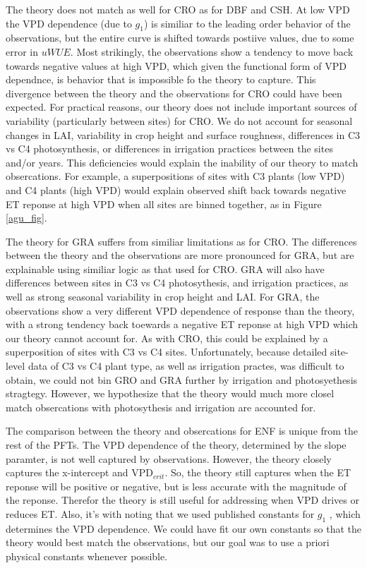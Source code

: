 \documentclass[draft,linenumbers]{agujournal}
\begin{document}
The theory does not match as well for CRO as for DBF and CSH. At low VPD the VPD dependence (due to $g_1$) is similiar to the leading order behavior of the observations, but the entire curve is shifted towards postiive values, due to some error in $uWUE$. Most strikingly, the observations show a tendency to move back towards negative values at high VPD, which given the functional form of VPD dependnce, is behavior that is impossible fo the theory to capture. This divergence between the theory and the observations for CRO could have been expected. For practical reasons, our theory does not include important sources of variability (particularly between sites) for CRO. We do not account for seasonal changes in LAI, variability in crop height and surface roughness, differences in C3 vs C4 photosynthesis, or differences in irrigation practices between the sites and/or years. This deficiencies would explain the inability of our theory to match obsercations. For example, a superpositions of sites with C3 plants (low VPD) and C4 plants (high VPD) would explain observed shift back towards negative ET reponse at high VPD when all sites are binned together, as in Figure \ref{agu_fig}.   

The theory for GRA suffers from similiar limitations as for CRO. The differences between the theory and the observations are more pronounced for GRA, but are explainable using similiar logic as that used for CRO. GRA will also have differences between sites in C3 vs C4 photosythesis, and irrigation practices, as well as strong seasonal variability in crop height and LAI. For GRA, the observations show a very different VPD dependence of response than the theory, with a strong tendency back toewards a negative ET reponse at high VPD which our theory cannot account for. As with CRO, this could be explained by a superposition of sites with C3 vs C4 sites. Unfortunately, because detailed site-level data of C3 vs C4 plant type, as well as irrigation practes, was difficult to obtain, we could not bin GRO and GRA further by irrigation and photosyethesis stragtegy. However, we hypothesize that the theory would much more closel match obsercations with photosythesis and irrigation are accounted for. 

The comparison between the theory and obsercations for ENF is unique from the rest of the PFTs. The VPD dependence of the theory, determined by the slope paramter, is not well captured by observations. However, the theory closely captures the x-intercept and VPD$_{crit}$. So, the theory still captures when the ET reponse will be positive or negative, but is less accurate with the magnitude of the reponse. Therefor the theory is still useful for addressing when VPD drives or reduces ET. Also, it's with noting that we used published constants for $g_1$ \citep[from ][]{Lin_2015}, which determines the VPD dependence. We could have fit our own constants so that the theory would best match the observations, but our goal was to use a priori physical constants whenever possible.
\end{document}
